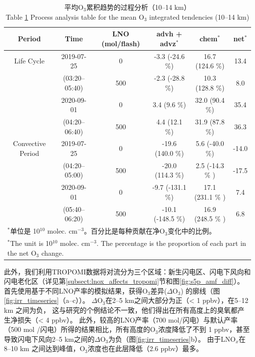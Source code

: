 \begin{table}[h]
\centering
\caption{平均O$_3$累积趋势的过程分析（10--14 km）\\ Table \ref{table:ipr} Process analysis table for the mean O$_3$ integrated tendencies (10--14 km)}
\begin{tabular}{@{\extracolsep{\fill}} cccccc}
\hline
  Period           & Time             & LNO (mol/flash) & advh + advz$^*$       & chem$^*$              & net$^*$    \\
\hline
Life Cycle         & 2019-07-25       & 0               & -3.3 (-24.6 \%)        & 16.7 (124.6 \%)        & 13.4       \\
                   & (03:20--05:40)   & 500             & -2.3 (-28.8 \%)        & 10.3 (128.8 \%)        & 8.0        \\
\cline{2-6}
                   & 2020-09-01       & 0               & 3.4  (9.6 \%)          & 32.0 (90.4 \%)         & 35.4       \\
                   & (04:20--06:40)   & 500             & 4.4  (12.1 \%)         & 31.9 (87.8 \%)         & 36.3       \\
\hline
Convective Period   & 2019-07-25      & 0              & -19.6 (140.0 \%)       & 5.6 (-40.0 \%)         & -14.0      \\
                    & (04:20--05:00)  & 500            & -20.0 (114.3 \%)       & 2.5 (-14.3 \% )        & -17.5      \\
\cline{2-6}
                    & 2020-09-01      & 0              & -9.7  (-131.1 \%)      & 17.1 (231.1 \% )       & 7.4        \\
                    & (05:40--06:20)  & 500            & -10.1 (-148.5 \%)      & 16.9 (248.5 \% )       & 6.8        \\
\hline
\multicolumn{6}{l}{$^{*}$单位是 10$^{10}$ molec. cm$^{-3}$。百分比是每种贡献在净O$_3$变化中的比例。} \\
\multicolumn{6}{l}{$^{*}$The unit is 10$^{10}$ molec. cm$^{-3}$. The percentage is the proportion of each part in the net O$_3$ change.}
\end{tabular}
\label{table:ipr}
\end{table}


此外，我们利用TROPOMI数据将对流分为三个区域：新生闪电区、闪电下风向和闪电老化区（详见第\ref{subsect:lnox_affects_tropomi}节和图\ref{fig:s5p_amf_diff}）。
首先使用基于不同LNO产率的模拟结果，获得O$_3$差异($\Delta$O$_3$) 的廓线（图\ref{fig:irr_timeseries}（a--c））。
$\Delta$O$_3$在2--5 km之间大部分为正（< 1 ppbv），在5--12 km 之间为负，
这与\citet{Ott.2007}研究的个例结论不一致，他们得出在所有高度上的臭氧都产生净损失（< 4 ppbv）。
此外，较高的LNO产率（700 mol/闪电）与默认产率（500 mol /闪电）所得的结果相比，所有高度的O$_3$浓度降低了不到 1 ppbv，甚至导致闪电下风向2--5 km之间的$\Delta$O$_3$为负（图\ref{fig:irr_timeseries}b）。
由于LNO$_x$在8--10 km 之间达到峰值，O$_3$浓度也在此层降低（2.6 ppbv）最多。

